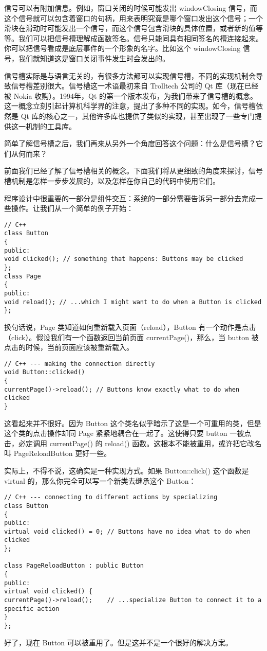 信号可以有附加信息。例如，窗口关闭的时候可能发出 windowClosing 信号，而这个信号就可以包含着窗口的句柄，用来表明究竟是哪个窗口发出这个信号；一个滑块在滑动时可能发出一个信号，而这个信号包含滑块的具体位置，或者新的值等等。我们可以把信号槽理解成函数签名。信号只能同具有相同签名的槽连接起来。你可以把信号看成是底层事件的一个形象的名字。比如这个 windowClosing 信号，我们就知道这是窗口关闭事件发生时会发出的。

信号槽实际是与语言无关的，有很多方法都可以实现信号槽，不同的实现机制会导致信号槽差别很大。信号槽这一术语最初来自 Trolltech 公司的 Qt 库（现在已经被 Nokia 收购）。1994年，Qt 的第一个版本发布，为我们带来了信号槽的概念。这一概念立刻引起计算机科学界的注意，提出了多种不同的实现。如今，信号槽依然是 Qt 库的核心之一，其他许多库也提供了类似的实现，甚至出现了一些专门提供这一机制的工具库。

简单了解信号槽之后，我们再来从另外一个角度回答这个问题：什么是信号槽？它们从何而来？

前面我们已经了解了信号槽相关的概念。下面我们将从更细致的角度来探讨，信号槽机制是怎样一步步发展的，以及怎样在你自己的代码中使用它们。

程序设计中很重要的一部分是组件交互：系统的一部分需要告诉另一部分去完成一些操作。让我们从一个简单的例子开始：

\begin{lstlisting}
// C++
class Button
{
public:
void clicked(); // something that happens: Buttons may be clicked
};
class Page
{
public:
void reload(); // ...which I might want to do when a Button is clicked
};
\end{lstlisting}
换句话说，Page 类知道如何重新载入页面（reload），Button 有一个动作是点击（click）。假设我们有一个函数返回当前页面 currentPage()，那么，当 button 被点击的时候，当前页面应该被重新载入。

\begin{lstlisting}
// C++ --- making the connection directly
void Button::clicked()
{
currentPage()->reload(); // Buttons know exactly what to do when clicked
}
\end{lstlisting}
这看起来并不很好。因为 Button 这个类名似乎暗示了这是一个可重用的类，但是这个类的点击操作却同 Page 紧紧地耦合在一起了。这使得只要 button 一被点击，必定调用 currentPage() 的 reload() 函数。这根本不能被重用，或许把它改名叫 PageReloadButton 更好一些。

实际上，不得不说，这确实是一种实现方式。如果 Button::click() 这个函数是 virtual 的，那么你完全可以写一个新类去继承这个 Button：

\begin{lstlisting}
// C++ --- connecting to different actions by specializing
class Button
{
public:
virtual void clicked() = 0; // Buttons have no idea what to do when clicked
};

class PageReloadButton : public Button
{
public:
virtual void clicked() {
currentPage()->reload();    // ...specialize Button to connect it to a specific action
}
};
\end{lstlisting}
好了，现在 Button 可以被重用了。但是这并不是一个很好的解决方案。

